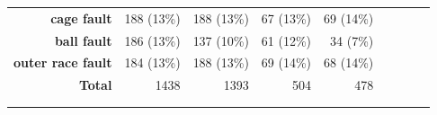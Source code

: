 \begin{table}[ht]
\begin{tabular}{rrrrrllll}
\multicolumn{1}{|r|}{\textbf{cage fault}}             & \multicolumn{1}{r|}{188 (13\%)}                 & \multicolumn{1}{r|}{188 (13\%)}                 & \multicolumn{1}{r|}{67 (13\%)}                             & \multicolumn{1}{r|}{69 (14\%)}                            &                               &                               &                               &                               \\ \cline{1-5}
\multicolumn{1}{|r|}{\textbf{ball fault}}             & \multicolumn{1}{r|}{186 (13\%)}                 & \multicolumn{1}{r|}{137 (10\%)}                 & \multicolumn{1}{r|}{61 (12\%)}                             & \multicolumn{1}{r|}{34 (7\%)}                             &                               &                               &                               &                               \\ \cline{1-5}
\multicolumn{1}{|r|}{\textbf{outer race fault}}       & \multicolumn{1}{r|}{184 (13\%)}                 & \multicolumn{1}{r|}{188 (13\%)}                 & \multicolumn{1}{r|}{69 (14\%)}                             & \multicolumn{1}{r|}{68 (14\%)}                            &                               &                               &                               &                               \\ \cline{1-5}
\multicolumn{1}{|r|}{\textbf{Total}}                  & \multicolumn{1}{r|}{1438}                       & \multicolumn{1}{r|}{1393}                       & \multicolumn{1}{r|}{504}                                   & \multicolumn{1}{r|}{478}                                  & \multicolumn{1}{r}{\textbf{}} & \multicolumn{1}{r}{\textbf{}} & \multicolumn{1}{r}{\textbf{}} & \multicolumn{1}{r}{\textbf{}} \\ \cline{1-5}
\textbf{}                                             &                                                 &                                                 &                                                            &                                                           & \multicolumn{1}{r}{}          & \multicolumn{1}{r}{}          & \multicolumn{1}{r}{}          & \multicolumn{1}{r}{}          \\
\textbf{}                                             &                                                 &                                                 &                                                            &                                                           & \multicolumn{1}{r}{}          & \multicolumn{1}{r}{}          & \multicolumn{1}{r}{}          & \multicolumn{1}{r}{}          \\

\end{tabular}
\end{table}
